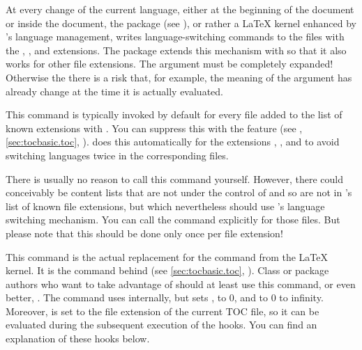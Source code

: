 \begin{Declaration}
\end{Declaration}
At every change of the current language, either at the beginning of the
document or inside the document, the 
package (see \cite{package:babel}), or rather a \LaTeX{} kernel enhanced by
's language management, writes language-switching commands to
the files with the , , and  extensions. The
 package extends this mechanism with
 so that it also works for other file extensions.
The  argument must be completely expanded! Otherwise the
there is a risk that, for example, the meaning of the argument has already
change at the time it is actually evaluated.

This command is typically invoked by default for every file 
added to the list of known extensions with
. You can suppress this with the
 feature (see
, \autoref{sec:tocbasic.toc},
).  does this
automatically for the extensions , , and  to
avoid switching languages twice in the corresponding files.

There is usually no reason to call this command yourself. However, there could
conceivably be content lists that are not under the control of
 and so are not in 's list of known file
extensions, but which nevertheless should use 's language
switching mechanism. You can call the command explicitly for those files.
But please note that this should be done only once per
file extension!%
\EndIndexGroup


\begin{Declaration}
\end{Declaration}
This command is the actual replacement for the
 command
from the \LaTeX{} kernel. It is the command behind
 (see \autoref{sec:tocbasic.toc},
). Class or package authors who want to
take advantage of  should at least use this command, or even
better, . The command uses
\Macro{\@starttoc} internally, but sets
,
 to 0, and  to 0
to infinity. Moreover,
 is set to the
file extension of the current TOC file, so it can be evaluated during the
subsequent execution of the hooks. You can find an explanation of these hooks
below.

